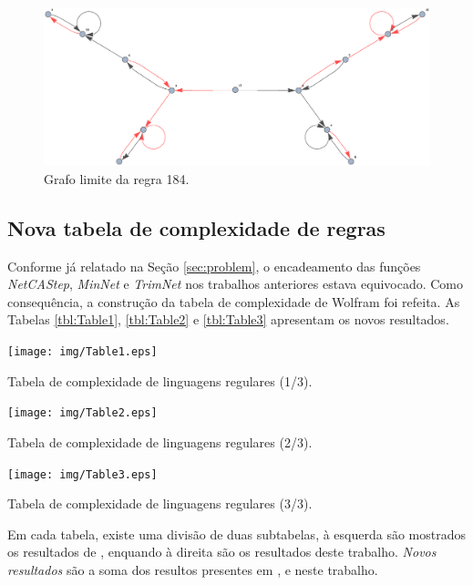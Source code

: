 \documentclass[12pt,a4paper]{article}
\begin{document}
\begin{figure}[htp]
\begin{center}
\includegraphics[scale=0.60]{img/limit184w.eps}
\caption{Grafo limite da regra 184.}
\label{fig:limit184w}
\end{center}
\end{figure}

\subsection{Nova tabela de complexidade de regras}\label{sec:table}

Conforme já relatado na Seção \ref{sec:problem}, o encadeamento das
funções \emph{NetCAStep}, \emph{MinNet} e \emph{TrimNet} nos trabalhos anteriores estava
equivocado. Como consequência, a construção da tabela de complexidade
de Wolfram foi refeita. As Tabelas \ref{tbl:Table1}, \ref{tbl:Table2}
e \ref{tbl:Table3} apresentam os novos resultados.

\begin{table}
\centering
\texttt{[image: img/Table1.eps]}
\caption{Tabela de complexidade de linguagens regulares (1/3).}
\label{tbl:Table1}
\end{table}

\begin{table}
\centering
\texttt{[image: img/Table2.eps]}
\caption{Tabela de complexidade de linguagens regulares (2/3).}
\label{tbl:Table2}
\end{table}

\begin{table}
\centering
\texttt{[image: img/Table3.eps]}
\caption{Tabela de complexidade de linguagens regulares (3/3).}
\label{tbl:Table3}
\end{table}

Em cada tabela, existe uma divisão de duas subtabelas, à esquerda são
mostrados os resultados de , enquando à direita
são os resultados deste trabalho. \textit{Novos resultados} são a soma
dos resultos presentes em , 
e neste trabalho.
\end{document}
